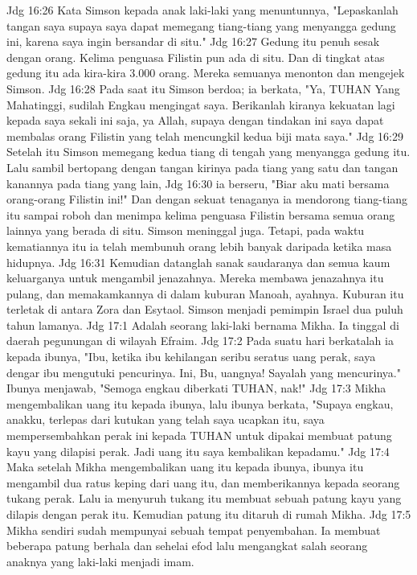 Jdg 16:26  Kata Simson kepada anak laki-laki yang menuntunnya, "Lepaskanlah tangan saya supaya saya dapat memegang tiang-tiang yang menyangga gedung ini, karena saya ingin bersandar di situ."
Jdg 16:27  Gedung itu penuh sesak dengan orang. Kelima penguasa Filistin pun ada di situ. Dan di tingkat atas gedung itu ada kira-kira 3.000 orang. Mereka semuanya menonton dan mengejek Simson.
Jdg 16:28  Pada saat itu Simson berdoa; ia berkata, "Ya, TUHAN Yang Mahatinggi, sudilah Engkau mengingat saya. Berikanlah kiranya kekuatan lagi kepada saya sekali ini saja, ya Allah, supaya dengan tindakan ini saya dapat membalas orang Filistin yang telah mencungkil kedua biji mata saya."
Jdg 16:29  Setelah itu Simson memegang kedua tiang di tengah yang menyangga gedung itu. Lalu sambil bertopang dengan tangan kirinya pada tiang yang satu dan tangan kanannya pada tiang yang lain,
Jdg 16:30  ia berseru, "Biar aku mati bersama orang-orang Filistin ini!" Dan dengan sekuat tenaganya ia mendorong tiang-tiang itu sampai roboh dan menimpa kelima penguasa Filistin bersama semua orang lainnya yang berada di situ. Simson meninggal juga. Tetapi, pada waktu kematiannya itu ia telah membunuh orang lebih banyak daripada ketika masa hidupnya.
Jdg 16:31  Kemudian datanglah sanak saudaranya dan semua kaum keluarganya untuk mengambil jenazahnya. Mereka membawa jenazahnya itu pulang, dan memakamkannya di dalam kuburan Manoah, ayahnya. Kuburan itu terletak di antara Zora dan Esytaol. Simson menjadi pemimpin Israel dua puluh tahun lamanya.
Jdg 17:1  Adalah seorang laki-laki bernama Mikha. Ia tinggal di daerah pegunungan di wilayah Efraim.
Jdg 17:2  Pada suatu hari berkatalah ia kepada ibunya, "Ibu, ketika ibu kehilangan seribu seratus uang perak, saya dengar ibu mengutuki pencurinya. Ini, Bu, uangnya! Sayalah yang mencurinya." Ibunya menjawab, "Semoga engkau diberkati TUHAN, nak!"
Jdg 17:3  Mikha mengembalikan uang itu kepada ibunya, lalu ibunya berkata, "Supaya engkau, anakku, terlepas dari kutukan yang telah saya ucapkan itu, saya mempersembahkan perak ini kepada TUHAN untuk dipakai membuat patung kayu yang dilapisi perak. Jadi uang itu saya kembalikan kepadamu."
Jdg 17:4  Maka setelah Mikha mengembalikan uang itu kepada ibunya, ibunya itu mengambil dua ratus keping dari uang itu, dan memberikannya kepada seorang tukang perak. Lalu ia menyuruh tukang itu membuat sebuah patung kayu yang dilapis dengan perak itu. Kemudian patung itu ditaruh di rumah Mikha.
Jdg 17:5  Mikha sendiri sudah mempunyai sebuah tempat penyembahan. Ia membuat beberapa patung berhala dan sehelai efod lalu mengangkat salah seorang anaknya yang laki-laki menjadi imam.
